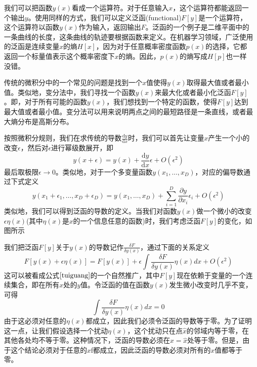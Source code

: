 我们可以把函数$y(x)$看成一个运算符。对于任意输入$x$，这个运算符都能返回一个输出$y$。使用同样的方式，我们可以定义泛函(functional)$F[y]$是一个运算符，这个运算符以函数$y(x)$作为输入，返回输出$F$。泛函的一个例子是二维平面中的一条曲线的长度，这条曲线的轨迹要根据函数来定义。在机器学习领域，广泛使用的泛函是连续变量$x$的熵$H[x]$，因为对于任意概率密度函数$p(x)$的选择，它都返回一个标量值表示这个概率密度下$x$的熵。因此，$p(x)$的熵写成$H[p]$也一样没错。

传统的微积分中的一个常见的问题是找到一个$x$值使得$y(x)$取得最大值或者最小值。类似地，变分法中，我们寻找一个函数$y(x)$来最大化或者最小化泛函$F[y]$。即，对于所有可能的函数$y(x)$，我们想找到一个特定的函数，使得$F[y]$达到最大值或者最小值。变分法可以用来说明两点之间的最短路径是一条直线，或者最大熵分布是高斯分布。

按照微积分规则，我们在求传统的导数$\frac{\mathrm{d}y}{\mathrm{d}x}$时，我们可以首先让变量$x$产生一个小的改变$\epsilon$，然后对$\epsilon$进行幂级数展开，即
\begin{equation}
\label{tuiguang}
	y(x+\epsilon)=y(x)+\frac{\mathrm{d}y}{\mathrm{d}x}\epsilon+O(\epsilon^2)
\end{equation}
最后取极限$\epsilon\to 0$。类似地，对于一个多变量函数$y(x_1,\dots,x_D)$，对应的偏导数通过下式定义
\begin{equation}
	y(x_1+\epsilon_1,\dots,x_D+\epsilon_D)=y(x_1,\dots,x_D)+\sum_{i=1}^{D}\frac{\partial y}{\partial x_i}\epsilon_i +O(\epsilon^2)
\end{equation}
类似地，我们可以得到泛函的导数的定义。当我们对函数$y(x)$做一个微小的改变$\epsilon\eta(x)$(其中$\eta(x)$是$x$的一个信息任意的函数)时，我们考虑泛函$F[y]$的变化，如图所示
\begin{center}
\end{center}
我们把泛函$F[y]$关于$y(x)$的导数记作$\frac{\delta F}{\delta y(x)}$，通过下面的关系定义
\begin{equation}
\label{zhuanhua}
	F[y(x)+\epsilon\eta(x)]=F[y(x)]+\epsilon\int \frac{\delta F}{\delta y(x)}\eta(x) dx + O(\epsilon^2)
\end{equation}
这可以被看成公式$\ref{tuiguang}$的一个自然推广，其中$F[y]$现在依赖于变量的一个连续集合，即在所有$x$处的$y$值。令泛函的值在函数$y(x)$发生微小改变时几乎不变，可得
\begin{equation}
	\int \frac{\delta F}{\delta y(x)}\eta(x) dx=0
\end{equation}
由于这必须对任意的$\eta(x)$都成立，因此我们必须令泛函的导数等于零。为了证明这一点，让我们假设选择一个扰动$\eta(x)$，这个扰动只在点$\hat{x}$的邻域内等于零，在其他各处均不等于零。这种情况下，泛函的导数必须在$x=\hat{x}$处等于零。但是，由于这个结论必须对于任意的$\hat{x}$f都成立，因此泛函的导数必须对所有的$x$值都等于零。

